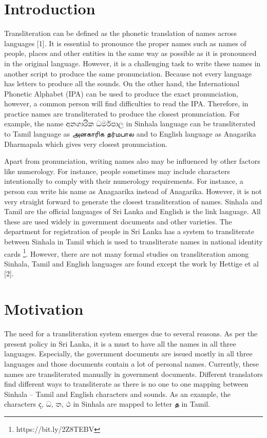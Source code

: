 \documentclass[10pt, a4paper, conference, compsocconf]{IEEEtran}
\begin{document}
\section{Introduction}

Transliteration can be defined as the phonetic translation of names across languages [1]. It is essential to pronounce the proper names such as names of people, places and other entities in the same way as possible as it is pronounced in the original language. However, it is a challenging task to write these names in another script to produce the same pronunciation. Because not every language has letters to produce all the sounds. On the other hand,  the International Phonetic Alphabet (IPA) can be used to produce the exact pronunciation, however, a common person will find difficulties to read the IPA. Therefore, in practice names are transliterated to produce the closest pronunciation. For example, the name {\sifont අනගාරික ධර්මපාල} in Sinhala language can be transliterated to Tamil language as {\tam அனகாரிக தர்மபால} and to English language as Anagarika Dharmapala which gives very closest pronunciation.

Apart from pronunciation, writing names also may be influenced by other factors like numerology. For instance, people sometimes may include characters intentionally to comply with their numerology requirements. For instance, a person can write his name as Anagaarika instead of Anagarika. However, it is not very straight forward to generate the closest transliteration of names. 
Sinhala and Tamil are the official languages of Sri Lanka and English is the link language. All these are used widely in government documents and other varieties. The department for registration of people in Sri Lanka has a system to transliterate between Sinhala in Tamil which is used to transliterate names in national identity cards \footnote{https://bit.ly/2Z8TEBV}. However, there are not many formal studies on transliteration among Sinhala, Tamil and English languages are found except the work by Hettige et al [2].


\section{Motivation}
The need for a transliteration system emerges due to several reasons. As per the present policy in Sri Lanka, it is a must to have all the names in all three languages. Especially, the government documents are issued mostly in all three languages and those documents contain a lot of personal names. Currently, these names are transliterated manually in government documents. Different translators find different ways to transliterate as there is no one to one mapping between Sinhala – Tamil and English characters and sounds. As an example, the characters {\sifont ද}, {\sifont  ධ}, {\sifont ත}, {\sifont ථ } in Sinhala are mapped to letter {\tam த}  in Tamil. 
\end{document}
